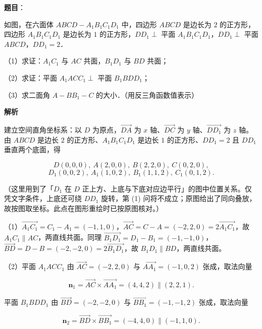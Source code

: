 \begin{answer}

\textbf{题目}：

如图，在六面体 $ABCD-A_1B_1C_1D_1$ 中，四边形 $ABCD$ 是边长为 $2$ 的正方形，四边形 $A_1B_1C_1D_1$ 是边长为 $1$ 的正方形，$DD_1\perp$ 平面 $A_1B_1C_1D_1$，$DD_1\perp$ 平面 $ABCD$，$DD_1=2$．

（1）求证：$A_1C_1$ 与 $AC$ 共面，$B_1D_1$ 与 $BD$ 共面；

（2）求证：平面 $A_1ACC_1\perp$ 平面 $B_1BDD_1$；

（3）求二面角 $A-BB_1-C$ 的大小．（用反三角函数值表示）
\nopagebreak[4]
\begin{center}\end{center}
\nopagebreak[4]
\textbf{解析}

建立空间直角坐标系：以 $D$ 为原点，$\overrightarrow{DA}$ 为 $x$ 轴、$\overrightarrow{DC}$ 为 $y$ 轴、$\overrightarrow{DD_1}$ 为 $z$ 轴。由 $ABCD$ 是边长 $2$ 的正方形、$A_1B_1C_1D_1$ 是边长 $1$ 的正方形、$DD_1=2$ 且 $DD_1$ 垂直两个底面，得

\nopagebreak[4]
\[D(0,0,0),\ A(2,0,0),\ B(2,2,0),\ C(0,2,0),\]
\nopagebreak[4]
\[D_1(0,0,2),\ A_1(1,0,2),\ B_1(1,1,2),\ C_1(0,1,2).\]

（这里用到了「$D_1$ 在 $D$ 正上方、上底与下底对应边平行」的图中位置关系。仅凭文字条件，上底还可绕 $DD_1$ 旋转，第 (1) 问将不成立；原图给出了同向叠放，故按图取坐标。此点在图形重绘时已按原图核对。）

（1）$\overrightarrow{A_1C_1}=C_1-A_1=(-1,1,0)$，$\overrightarrow{AC}=C-A=(-2,2,0)=2\overrightarrow{A_1C_1}$，故 $A_1C_1\parallel AC$，两直线共面。同理 $\overrightarrow{B_1D_1}=D_1-B_1=(-1,-1,0)$，$\overrightarrow{BD}=D-B=(-2,-2,0)=2\overrightarrow{B_1D_1}$，故 $B_1D_1\parallel BD$，两直线共面。

（2）平面 $A_1ACC_1$ 由 $\overrightarrow{AC}=(-2,2,0)$ 与 $\overrightarrow{AA_1}=(-1,0,2)$ 张成，取法向量

\nopagebreak[4]
\[\boldsymbol n_1=\overrightarrow{AC}\times\overrightarrow{AA_1}=(4,4,2)\parallel(2,2,1).\]

平面 $B_1BDD_1$ 由 $\overrightarrow{BD}=(-2,-2,0)$ 与 $\overrightarrow{BB_1}=(-1,-1,2)$ 张成，取法向量

\nopagebreak[4]
\[\boldsymbol n_2=\overrightarrow{BD}\times\overrightarrow{BB_1}=(-4,4,0)\parallel(-1,1,0).\]


\end{answer}
